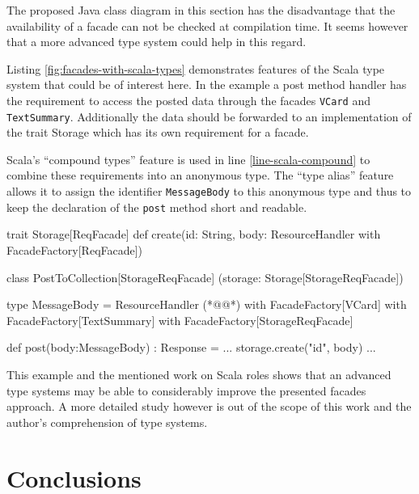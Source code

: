\documentclass[11pt,a4paper,headsepline,twoside]{scrartcl}		%
\begin{document}

The proposed Java class diagram in this section has the disadvantage that the
availability of a facade can not be checked at compilation time. It seems
however that a more advanced type system could help in this regard.

Listing \ref{fig:facades-with-scala-types} demonstrates features of the Scala
type system \cite{Odersky2011} that could be of interest here. In the example a
post method handler has the requirement to access the posted data through the
facades \lstinline:VCard: and \lstinline:TextSummary:. Additionally the data
should be forwarded to an implementation of the trait Storage which has its own
requirement for a facade.

Scala's ``compound types'' feature is used in line \ref{line-scala-compound} to
combine these requirements into an anonymous type. The ``type alias'' feature
allows it to assign the identifier \lstinline:MessageBody: to this anonymous
type and thus to keep the declaration of the \lstinline:post: method short and
readable.

\begin{javalisting}[label=fig:facades-with-scala-types,
                   numbers=left,
                   escapeinside={(*@}{@*)},
                   caption={Implementing the facades approach with Scala's type system}]
trait Storage[ReqFacade] {
 def create(id: String,
            body: ResourceHandler
                  with FacadeFactory[ReqFacade])
}

class PostToCollection[StorageReqFacade]
            (storage: Storage[StorageReqFacade]) {
 type MessageBody = ResourceHandler (*@\label{line-scala-compound}@*)
                    with FacadeFactory[VCard] 
                    with FacadeFactory[TextSummary]
                    with FacadeFactory[StorageReqFacade]
  
 def post(body:MessageBody) : Response = {
  ...
  storage.create("id", body)
  ...
 }
}
\end{javalisting}

This example and the mentioned work on Scala roles shows that an advanced type
systems may be able to considerably improve the presented facades approach. A
more detailed study however is out of the scope of this work and the author's
comprehension of type systems. %

\section{Conclusions}
\label{sec:conclusions}
\end{document}
